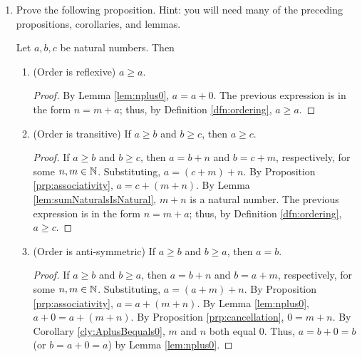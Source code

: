 \documentclass[../main.tex]{subfiles}
\begin{document}
\begin{enumerate}[ref={\thesection.\arabic*}]
    \begin{lem}\label{lem:backwardsIncrement}
        Let $a$ be a positive number. Then there exists exactly one natural number $b$ such that $b\pplus=a$.
        \begin{proof}
            We induct on $a$. Consider the base case $a=1$. $1=0\pplus$ by definition, and by Axiom \ref{axm:successorDistinctness}, 0 is the only $b$ satisfying $1=b\pplus$. Now suppose inductively that $a$ has only one $b$ satisfying $b\pplus=a$. Then $a\pplus$ has only one natural number (namely $a$) satisfying $a\pplus=a\pplus$. This closes the induction.
        \end{proof}
    \end{lem}
    \item \label{exr:2.2.3}Prove the following proposition. Hint: you will need many of the preceding propositions, corollaries, and lemmas.
    \begin{prop}\label{prp:ordering}
        Let $a,b,c$ be natural numbers. Then
        \begin{enumerate}[label={\textup{(}\alph*\textup{)}}]
            \item \textup{(}Order is reflexive\textup{)} $a\geq a$.
            \begin{proof}
                By Lemma \ref{lem:nplus0}, $a=a+0$. The previous expression is in the form $n=m+a$; thus, by Definition \ref{dfn:ordering}, $a\geq a$.
            \end{proof}
            \item \textup{(}Order is transitive\textup{)} If $a\geq b$ and $b\geq c$, then $a\geq c$.
            \begin{proof}
                If $a\geq b$ and $b\geq c$, then $a=b+n$ and $b=c+m$, respectively, for some $n,m\in\mathbb{N}$. Substituting, $a=(c+m)+n$. By Proposition \ref{prp:associativity}, $a=c+(m+n)$. By Lemma \ref{lem:sumNaturalsIsNatural}, $m+n$ is a natural number. The previous expression is in the form $n=m+a$; thus, by Definition \ref{dfn:ordering}, $a\geq c$.
            \end{proof}
            \item \textup{(}Order is anti-symmetric\textup{)} If $a\geq b$ and $b\geq a$, then $a=b$.
            \begin{proof}
                If $a\geq b$ and $b\geq a$, then $a=b+n$ and $b=a+m$, respectively, for some $n,m\in\mathbb{N}$. Substituting, $a=(a+m)+n$. By Proposition \ref{prp:associativity}, $a=a+(m+n)$. By Lemma \ref{lem:nplus0}, $a+0=a+(m+n)$. By Proposition \ref{prp:cancellation}, $0=m+n$. By Corollary \ref{cly:AplusBequals0}, $m$ and $n$ both equal 0. Thus, $a=b+0=b$ (or $b=a+0=a$) by Lemma \ref{lem:nplus0}.

\end{proof}
\end{enumerate}
\end{prop}
\end{enumerate}
\end{document}
